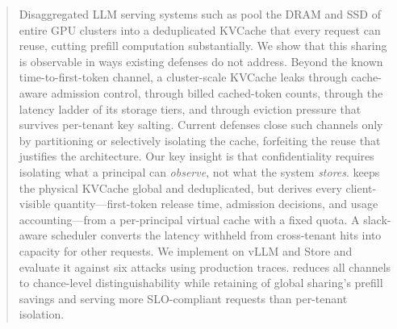 \begin{abstract}
Disaggregated LLM serving systems such as \mc pool the DRAM and SSD of
entire GPU clusters into a deduplicated KVCache that every request can reuse,
cutting prefill computation substantially. We show that this sharing is
observable in ways existing defenses do not address. Beyond the known
time-to-first-token channel, a cluster-scale KVCache leaks through cache-aware
admission control, through billed cached-token counts, through the latency
ladder of its storage tiers, and through eviction pressure that survives
per-tenant key salting. Current defenses close such channels only by
partitioning or selectively isolating the cache, forfeiting the reuse that
justifies the architecture.
Our key insight is that confidentiality requires isolating what a principal can
\emph{observe}, not what the system \emph{stores}. \sys keeps the physical
KVCache global and deduplicated, but derives every client-visible
quantity---first-token release time, admission decisions, and usage
accounting---from a per-principal virtual cache with a fixed quota. A
slack-aware scheduler converts the latency withheld from cross-tenant hits into
capacity for other requests. We implement \sys on vLLM and \mc Store and
evaluate it against six attacks using \mc production traces. \sys reduces
all  channels to chance-level distinguishability while retaining
 of global sharing's prefill savings and serving  more
SLO-compliant requests than per-tenant isolation.
\end{abstract}
